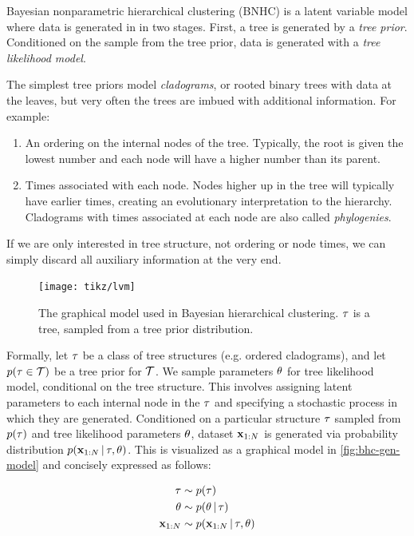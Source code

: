 Bayesian nonparametric hierarchical clustering (BNHC)
is a latent variable model where
data is generated in
in two stages.
First, a tree is generated by a
\emph{tree prior}.
Conditioned on the sample
from the tree prior,
data is generated with
a \emph{tree likelihood model}.

The simplest tree priors
model \emph{cladograms},
or rooted binary trees
with data at the leaves,
but very often the trees are imbued with
additional information.
For example:

\begin{enumerate}
  \item An ordering on the internal nodes of the tree.
    Typically, the root is given the lowest number and
    each node will have a higher number than its parent.
  \item Times associated with each node.
    Nodes higher up in the tree will typically have
    earlier times, creating an evolutionary
    interpretation to the hierarchy. Cladograms
    with times associated at each node
    are also called \emph{phylogenies}.
\end{enumerate}

If we are only interested in tree structure,
not ordering or node times, we can simply discard
all auxiliary information at the very end.

\begin{figure}[H]
  \centering
  \texttt{[image: tikz/lvm]}
  \caption{The graphical model used
  in Bayesian hierarchical clustering. $\tau$
  is a tree, sampled from a tree prior distribution.}
  \label{fig:bhc-gen-model}
\end{figure}

Formally,
let $\tau$ be a class
of tree structures (e.g. ordered cladograms),
and let $p(\tau \in \mathcal{T})$
be a tree prior
for $\mathcal{T}$.
We sample parameters $\theta$ for tree likelihood model,
conditional on the tree structure.
This involves assigning
latent parameters to each internal node in the $\tau$
and specifying a stochastic process in which they are generated.
Conditioned on a particular
structure $\tau$ sampled from $p(\tau)$
and tree likelihood parameters $\theta$, dataset
$\mathbf{x}_{1:N}$
is generated
via probability distribution $p(\mathbf{x}_{1:N} \,|\, \tau, \theta)$.
This is visualized as a graphical model in \autoref{fig:bhc-gen-model}
and concisely expressed as follows:

\begin{align*}
  \tau &\sim p(\tau) \\
  \theta &\sim p(\theta \,|\, \tau) \\
  \mathbf{x}_{1:N} &\sim p(\mathbf{x}_{1:N} \,|\, \tau, \theta)
\end{align*}

